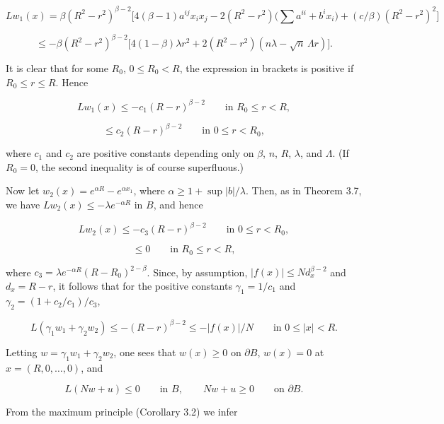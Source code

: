 \[
Lw_1(x)=\beta(R^2-r^2)^{\beta-2}\bigl[4(\beta-1)a^{ij}x_i x_j-2(R^2-r^2)\bigl(\sum a^{ii}+b^i x_i\bigr)
+(c/\beta)(R^2-r^2)^2\bigr]
\]

\[
\le -\beta(R^2-r^2)^{\beta-2}\bigl[4(1-\beta)\lambda r^2+2(R^2-r^2)(n\lambda-\sqrt{n}\,\Lambda r)\bigr].
\]

\begin{flushleft}
It is clear that for some $R_0$, $0\le R_0<R$, the expression in brackets is positive if
$R_0\le r\le R$. Hence
\end{flushleft}

\[
Lw_1(x)\le -c_1(R-r)^{\beta-2}\qquad\text{in }R_0\le r<R,
\]

\[
\le c_2(R-r)^{\beta-2}\qquad\text{in }0\le r<R_0,
\]

\begin{flushleft}
where $c_1$ and $c_2$ are positive constants depending only on $\beta$, $n$, $R$, $\lambda$, and $\Lambda$. (If $R_0=0$,
the second inequality is of course superfluous.)
\end{flushleft}

\begin{flushleft}
Now let $w_2(x)=e^{\alpha R}-e^{\alpha x_1}$, where $\alpha\ge 1+\sup\lvert b\rvert/\lambda$. Then, as in Theorem 3.7,
we have $Lw_2(x)\le -\lambda e^{-\alpha R}$ in $B$, and hence
\end{flushleft}

\[
Lw_2(x)\le -c_3(R-r)^{\beta-2}\qquad\text{in }0\le r<R_0,
\]

\[
\le 0\qquad\text{in }R_0\le r<R,
\]

\begin{flushleft}
where $c_3=\lambda e^{-\alpha R}(R-R_0)^{2-\beta}$. Since, by assumption, $\lvert f(x)\rvert\le Nd_x^{\beta-2}$ and $d_x=R-r$,
it follows that for the positive constants $\gamma_1=1/c_1$ and $\gamma_2=(1+c_2/c_1)/c_3$,
\end{flushleft}

\[
L(\gamma_1w_1+\gamma_2w_2)\le -(R-r)^{\beta-2}\le -\lvert f(x)\rvert/N\qquad\text{in }0\le\lvert x\rvert<R.
\]

\begin{flushleft}
Letting $w=\gamma_1w_1+\gamma_2w_2$, one sees that $w(x)\ge 0$ on $\partial B$, $w(x)=0$ at $x=(R,0,\ldots,0)$,
and
\end{flushleft}

\[
L(Nw+u)\le 0\qquad\text{in }B,\qquad Nw+u\ge 0\qquad\text{on }\partial B.
\]

\begin{flushleft}
From the maximum principle (Corollary 3.2) we infer
\end{flushleft}

